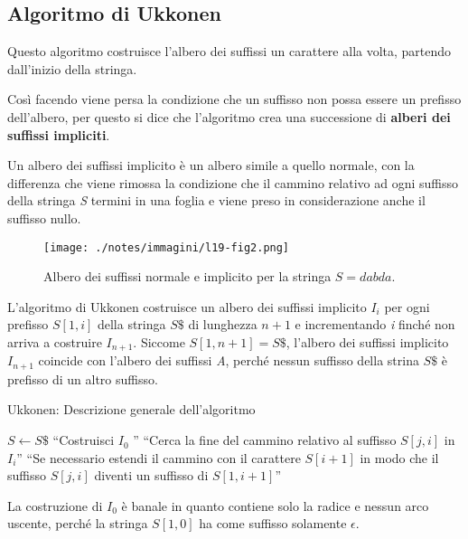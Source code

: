 \subsection{Algoritmo di Ukkonen}\label{algoritmo-di-ukkonen}

Questo algoritmo costruisce l'albero dei suffissi un carattere alla volta, partendo dall'inizio della stringa.

Così facendo viene persa la condizione che un suffisso non possa essere un prefisso dell'albero, per questo si dice che l'algoritmo crea una successione di \textbf{alberi dei suffissi impliciti}.

Un albero dei suffissi implicito è un albero simile a quello normale, con la differenza che viene rimossa la condizione che il cammino relativo ad ogni suffisso della stringa \textit{S} termini in una foglia e viene preso in considerazione anche il suffisso nullo.

\begin{figure}[htbp]
	\centering
	\texttt{[image: ./notes/immagini/l19-fig2.png]}
	\caption{Albero dei suffissi normale e implicito per la stringa $ S = dabda $.}
\end{figure}

L'algoritmo di Ukkonen costruisce un albero dei suffissi implicito $ I_i $ per ogni prefisso $ S[1,i] $ della stringa $ S\$ $ di lunghezza $ n+1 $ e incrementando \textit{i} finché non arriva a costruire $ I_{n+1} $. Siccome $ S[1,n+1] = S\$ $, l'albero dei suffissi implicito $ I_{n+1} $ coincide con l'albero dei suffissi \textit{A}, perché nessun suffisso della strina $ S\$ $ è prefisso di un altro suffisso.

\begin{breakablealgorithm}
	\caption{Ukkonen: Descrizione generale dell'algoritmo }
	\begin{algorithmic}[1]
			\State $ S \gets S\$ $ 
			\State ``Costruisci $ I_0 $ ''
					\State ``Cerca la fine del cammino relativo al suffisso $ S[j,i] $ in $ I_i $''
					\State ``Se necessario estendi il cammino con il carattere $S[i+1] $ in modo che il suffisso $ S[j,i] $ diventi un suffisso di $ S[1,i+1] $''
				\EndFor
			\EndFor
		\EndFunction
	\end{algorithmic}
\end{breakablealgorithm}

La costruzione di $ I_0 $ è banale in quanto contiene solo la radice e nessun arco uscente, perché la stringa $ S[1,0] $ ha come suffisso solamente $ \epsilon $.


